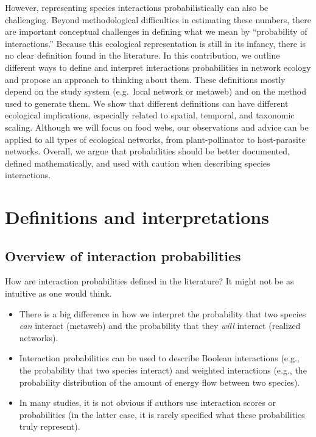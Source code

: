 \documentclass[11pt]{article}
\begin{document}
However, representing species interactions probabilistically can also be
challenging. Beyond methodological difficulties in estimating these
numbers, there are important conceptual challenges in defining what we
mean by ``probability of interactions.'' Because this ecological
representation is still in its infancy, there is no clear definition
found in the literature. In this contribution, we outline different ways
to define and interpret interactions probabilities in network ecology
and propose an approach to thinking about them. These definitions mostly
depend on the study system (e.g.~local network or metaweb) and on the
method used to generate them. We show that different definitions can
have different ecological implications, especially related to spatial,
temporal, and taxonomic scaling. Although we will focus on food webs,
our observations and advice can be applied to all types of ecological
networks, from plant-pollinator to host-parasite networks. Overall, we
argue that probabilities should be better documented, defined
mathematically, and used with caution when describing species
interactions.

\hypertarget{definitions-and-interpretations}{%
\section{Definitions and
interpretations}\label{definitions-and-interpretations}}

\hypertarget{overview-of-interaction-probabilities}{%
\subsection{Overview of interaction
probabilities}\label{overview-of-interaction-probabilities}}

How are interaction probabilities defined in the literature? It might
not be as intuitive as one would think.

\begin{itemize}
\tightlist
\item
  There is a big difference in how we interpret the probability that two
  species \emph{can} interact (metaweb) and the probability that they
  \emph{will} interact (realized networks).
\item
  Interaction probabilities can be used to describe Boolean interactions
  (e.g., the probability that two species interact) and weighted
  interactions (e.g., the probability distribution of the amount of
  energy flow between two species).
\item
  In many studies, it is not obvious if authors use interaction scores
  or probabilities (in the latter case, it is rarely specified what
  these probabilities truly represent).
\end{itemize}
\end{document}
